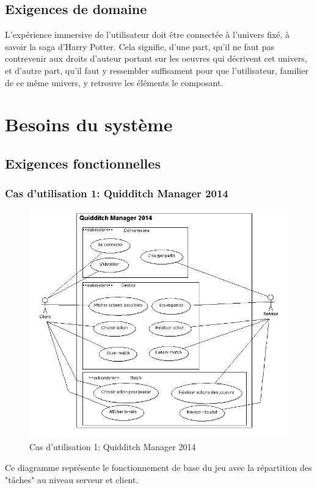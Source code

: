 \documentclass[a4paper,titlepage]{scrreprt}
\begin{document}
\section{Exigences de domaine}
  L'expérience immersive de l'utilisateur doit être connectée à l'univers fixé, 
  à savoir la saga d'Harry Potter. Cela signifie, d'une part, 
  qu'il ne faut pas contrevenir aux droits d'auteur portant sur les oeuvres 
  qui décrivent cet univers, et d'autre part, qu'il faut y ressembler suffisament pour que 
  l'utilisateur, familier de ce même univers, y retrouve les éléments le composant.
\chapter{Besoins du système}
\section{Exigences fonctionnelles}
 \subsection{Cas d'utilisation 1: Quidditch Manager 2014}
  \begin{figure}[H]
    \center
    \includegraphics[scale=0.7]{uml/QM2014.png}
    \caption{Cas d'utilisation 1: Quidditch Manager 2014}
  \end{figure}	
    Ce diagramme représente le fonctionnement de base du jeu avec la répartition des "tâches" au niveau serveur et client.
\end{document}
